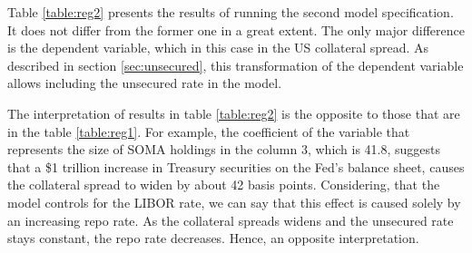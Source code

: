 \documentclass[11pt,a4paper,english,oneside]{article}
\begin{document}
Table \ref{table:reg2} presents the results of running the second model specification. It does not differ from the former one in a great extent. The only major difference is the dependent variable, which in this case in the US collateral spread. As described in section \ref{sec:unsecured}, this transformation of the dependent variable allows including the unsecured rate in the model.

The interpretation of results in table \ref{table:reg2} is the opposite to those that are in the table \ref{table:reg1}. For example, the coefficient of the variable that represents the size of SOMA holdings in the column 3, which is 41.8, suggests that a \$1 trillion increase in Treasury securities on the Fed's balance sheet, causes the collateral spread to widen by about 42 basis points. Considering, that the model controls for the LIBOR rate, we can say that this effect is caused solely by an increasing repo rate. As the collateral spreads widens and the unsecured rate stays constant, the repo rate decreases. Hence, an opposite interpretation.
\end{document}
